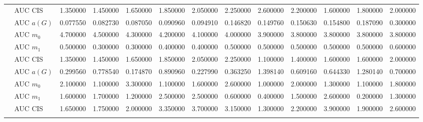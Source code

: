 \begin{table}[htbp]
\begin{tabular}{llrrrrrrrrrrr}
    & AUC CIS & 1.350000 & 1.450000 & 1.650000 & 1.850000 & 2.050000 & 2.250000 & 2.600000 & 2.200000 & 1.600000 & 1.800000 & 2.000000 \\
    \addlinespace
    \multirow{4}{*}{degree} & AUC $a(G)$ & 0.077550 & 0.082730 & 0.087050 & 0.090960 & 0.094910 & 0.146820 & 0.149760 & 0.150630 & 0.154800 & 0.187090 & 0.300000 \\
    & AUC $m_0$ & 4.700000 & 4.500000 & 4.300000 & 4.200000 & 4.100000 & 4.000000 & 3.900000 & 3.800000 & 3.800000 & 3.800000 & 3.800000 \\
    & AUC $m_1$ & 0.500000 & 0.300000 & 0.300000 & 0.400000 & 0.400000 & 0.500000 & 0.500000 & 0.500000 & 0.500000 & 0.500000 & 0.600000 \\
    & AUC CIS & 1.350000 & 1.450000 & 1.650000 & 1.850000 & 2.050000 & 2.250000 & 1.100000 & 1.400000 & 1.600000 & 1.600000 & 2.000000 \\
    \addlinespace
    \multirow{4}{*}{random} & AUC $a(G)$ & 0.299560 & 0.778540 & 0.174870 & 0.890960 & 0.227990 & 0.363250 & 1.398140 & 0.609160 & 0.644330 & 1.280140 & 0.700000 \\
    & AUC $m_0$ & 2.100000 & 1.100000 & 3.300000 & 1.100000 & 1.600000 & 2.600000 & 1.000000 & 2.000000 & 1.300000 & 1.100000 & 1.800000 \\
    & AUC $m_1$ & 1.600000 & 1.700000 & 1.200000 & 2.500000 & 2.500000 & 0.600000 & 0.400000 & 1.500000 & 2.600000 & 0.200000 & 1.300000 \\
    & AUC CIS & 1.650000 & 1.750000 & 2.000000 & 3.350000 & 3.700000 & 3.150000 & 1.300000 & 2.200000 & 3.900000 & 1.900000 & 2.600000 \\
    \addlinespace
    \bottomrule
  \end{tabular}
\end{table}

